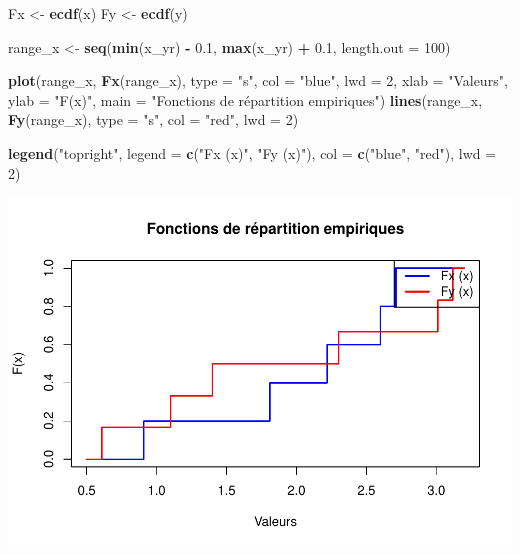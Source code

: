 \documentclass[
  12pt,
]{article}
\newenvironment{Shaded}{\begin{snugshade}}{\end{snugshade}}
\newcommand{\AttributeTok}[1]{\textcolor[rgb]{0.13,0.29,0.53}{#1}}
\newcommand{\DecValTok}[1]{\textcolor[rgb]{0.00,0.00,0.81}{#1}}
\newcommand{\FloatTok}[1]{\textcolor[rgb]{0.00,0.00,0.81}{#1}}
\newcommand{\FunctionTok}[1]{\textcolor[rgb]{0.13,0.29,0.53}{\textbf{#1}}}
\newcommand{\NormalTok}[1]{#1}
\newcommand{\OtherTok}[1]{\textcolor[rgb]{0.56,0.35,0.01}{#1}}
\newcommand{\SpecialCharTok}[1]{\textcolor[rgb]{0.81,0.36,0.00}{\textbf{#1}}}
\newcommand{\StringTok}[1]{\textcolor[rgb]{0.31,0.60,0.02}{#1}}
\begin{document}
\begin{Shaded}
\begin{Highlighting}[]
\NormalTok{Fx }\OtherTok{\textless{}{-}} \FunctionTok{ecdf}\NormalTok{(x)}
\NormalTok{Fy }\OtherTok{\textless{}{-}} \FunctionTok{ecdf}\NormalTok{(y)}

\NormalTok{range\_x }\OtherTok{\textless{}{-}} \FunctionTok{seq}\NormalTok{(}\FunctionTok{min}\NormalTok{(x\_yr) }\SpecialCharTok{{-}} \FloatTok{0.1}\NormalTok{, }\FunctionTok{max}\NormalTok{(x\_yr) }\SpecialCharTok{+} \FloatTok{0.1}\NormalTok{, }\AttributeTok{length.out =} \DecValTok{100}\NormalTok{)}

\FunctionTok{plot}\NormalTok{(range\_x, }\FunctionTok{Fx}\NormalTok{(range\_x), }\AttributeTok{type =} \StringTok{"s"}\NormalTok{, }\AttributeTok{col =} \StringTok{"blue"}\NormalTok{, }\AttributeTok{lwd =} \DecValTok{2}\NormalTok{,}
     \AttributeTok{xlab =} \StringTok{"Valeurs"}\NormalTok{, }\AttributeTok{ylab =} \StringTok{"F(x)"}\NormalTok{, }\AttributeTok{main =} \StringTok{"Fonctions de répartition empiriques"}\NormalTok{)}
\FunctionTok{lines}\NormalTok{(range\_x, }\FunctionTok{Fy}\NormalTok{(range\_x), }\AttributeTok{type =} \StringTok{"s"}\NormalTok{, }\AttributeTok{col =} \StringTok{"red"}\NormalTok{, }\AttributeTok{lwd =} \DecValTok{2}\NormalTok{)}

\FunctionTok{legend}\NormalTok{(}\StringTok{"topright"}\NormalTok{, }\AttributeTok{legend =} \FunctionTok{c}\NormalTok{(}\StringTok{"Fx (x)"}\NormalTok{, }\StringTok{"Fy (x)"}\NormalTok{), }\AttributeTok{col =} \FunctionTok{c}\NormalTok{(}\StringTok{"blue"}\NormalTok{, }\StringTok{"red"}\NormalTok{), }\AttributeTok{lwd =} \DecValTok{2}\NormalTok{)}
\end{Highlighting}
\end{Shaded}

\includegraphics{Stat_non_para_files/figure-latex/unnamed-chunk-119-1.pdf}
\end{document}
